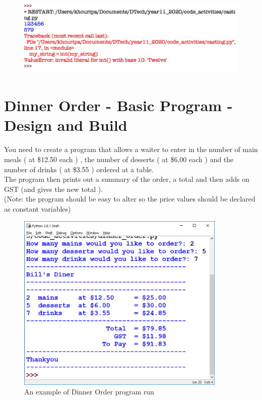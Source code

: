 \documentclass[a4paper,12pt]{article}
\begin{document}
\begin{figure} [!h]
	\centering
	\includegraphics[width=18cm]{screen_shots/casting.png}
\end{figure}
\newpage
\section{Dinner Order - Basic Program - Design and Build}
You need to create a program that allows a waiter to enter in the number of main meals ( at \$12.50 each ) , the number of desserts ( at \$6.00 each ) and the number of drinks ( at \$3.55 ) ordered at a table.\\
The program then prints out a summary of the order, a total and then adds on GST (and gives the new total ).\\
(Note: the program should be easy to alter so the price values should be declared as constant variables)


\begin{figure} [!h]
	\centering
	\includegraphics[width=10cm]{screen_shots/diner.png}
	\caption*{An example of Dinner Order program run}
\end{figure}
\end{document}
